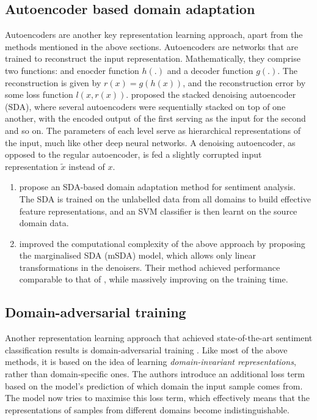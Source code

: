 \documentclass[12pt]{report}
\begin{document}
	\subsection{Autoencoder based domain adaptation}
	Autoencoders are another key representation learning approach, apart from the methods mentioned in the above sections. Autoencoders are networks that are trained to reconstruct the input representation. Mathematically, they comprise two functions: and enocder function $h(.)$ and a decoder function $g(.)$. The reconstruction is given by $r(x) = g(h(x))$, and the reconstruction error by some loss function $l(x,r(x))$. \citep{vincent2008extracting} proposed the stacked denoising autoencoder (SDA), where several autoencoders were sequentially stacked on top of one another, with the encoded output of the first serving as the input for the second and so on. The parameters of each level serve as hierarchical representations of the input, much like other deep neural networks. A denoising autoencoder, as opposed to the regular autoencoder, is fed a slightly corrupted input representation $\tilde{x}$ instead of $x$.
	\begin{enumerate}
		\item \citep{glorot2011domain} propose an SDA-based domain adaptation method for sentiment analysis. The SDA is trained on the unlabelled data from all domains to build effective feature representations, and an SVM classifier is then learnt on the source domain data. 
		\item  \citep{chen2012marginalized} improved the computational complexity of the above approach by proposing the marginalised SDA (mSDA) model, which allows only linear transformations in the denoisers. Their method achieved performance comparable to that of \citep{glorot2011domain}, while massively improving on the training time. 
	\end{enumerate}
	  
	\subsection{Domain-adversarial training}
	Another representation learning approach that achieved state-of-the-art sentiment classification results is domain-adversarial training \citep{ganin2016domain}. Like most of the above methods, it is based on the idea of learning \textit{domain-invariant representations}, rather than domain-specific ones. The authors introduce an additional loss term based on the model's prediction of which domain the input sample comes from. The model now tries to maximise this loss term, which effectively means that the representations of samples from different domains become indistinguishable. 
	
\end{document}
